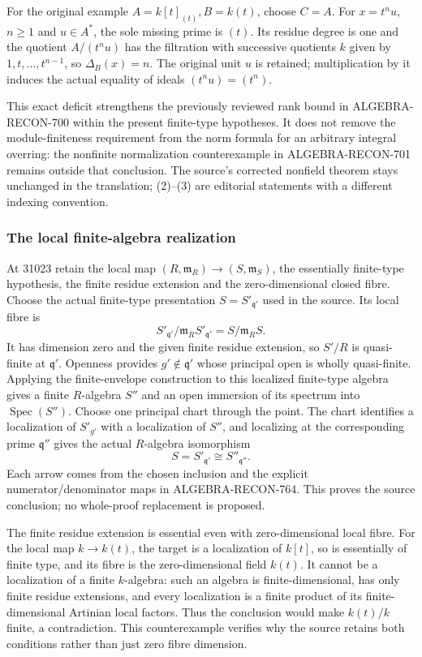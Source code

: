 For the original example \(A=k[t]_{(t)}, B=k(t)\), choose \(C=A\). For \(x=t^n u\), \(n\geq1\) and \(u\in A^*\), the sole missing prime is \((t)\). Its residue degree is one and the quotient \(A/(t^n u)\) has the filtration with successive quotients \(k\) given by \(1,t,\ldots,t^{n-1}\), so \(\Delta_B(x)=n\). The original unit \(u\) is retained; multiplication by it induces the actual equality of ideals \((t^n u)=(t^n)\).

This exact deficit strengthens the previously reviewed rank bound in ALGEBRA-RECON-700 within the present finite-type hypotheses. It does not remove the module-finiteness requirement from the norm formula for an arbitrary integral overring: the nonfinite normalization counterexample in ALGEBRA-RECON-701 remains outside that conclusion. The source's corrected nonfield theorem stays unchanged in the translation; (2)--(3) are editorial statements with a different indexing convention.

\subsubsection{The local finite-algebra realization}\label{the-local-finite-algebra-realization}

At 31023 retain the local map \((R,\mathfrak m_R)\to(S,\mathfrak m_S)\), the essentially finite-type hypothesis, the finite residue extension and the zero-dimensional closed fibre. Choose the actual finite-type presentation \(S=S'_{\mathfrak q'}\) used in the source. Its local fibre is \[
 S'_{\mathfrak q'}/\mathfrak m_R S'_{\mathfrak q'}
 =S/\mathfrak m_R S.
\] It has dimension zero and the given finite residue extension, so \(S'/R\) is quasi-finite at \(\mathfrak q'\). Openness provides \(g'\notin\mathfrak q'\) whose principal open is wholly quasi-finite. Applying the finite-envelope construction to this localized finite-type algebra gives a finite \(R\)-algebra \(S''\) and an open immersion of its spectrum into \(\operatorname{Spec}(S'')\). Choose one principal chart through the point. The chart identifies a localization of \(S'_{g'}\) with a localization of \(S''\), and localizing at the corresponding prime \(\mathfrak q''\) gives the actual \(R\)-algebra isomorphism \[
 S=S'_{\mathfrak q'}\cong S''_{\mathfrak q''}.
\] Each arrow comes from the chosen inclusion and the explicit numerator/denominator maps in ALGEBRA-RECON-764. This proves the source conclusion; no whole-proof replacement is proposed.

The finite residue extension is essential even with zero-dimensional local fibre. For the local map \(k\to k(t)\), the target is a localization of \(k[t]\), so is essentially of finite type, and its fibre is the zero-dimensional field \(k(t)\). It cannot be a localization of a finite \(k\)-algebra: such an algebra is finite-dimensional, has only finite residue extensions, and every localization is a finite product of its finite-dimensional Artinian local factors. Thus the conclusion would make \(k(t)/k\) finite, a contradiction. This counterexample verifies why the source retains both conditions rather than just zero fibre dimension.

